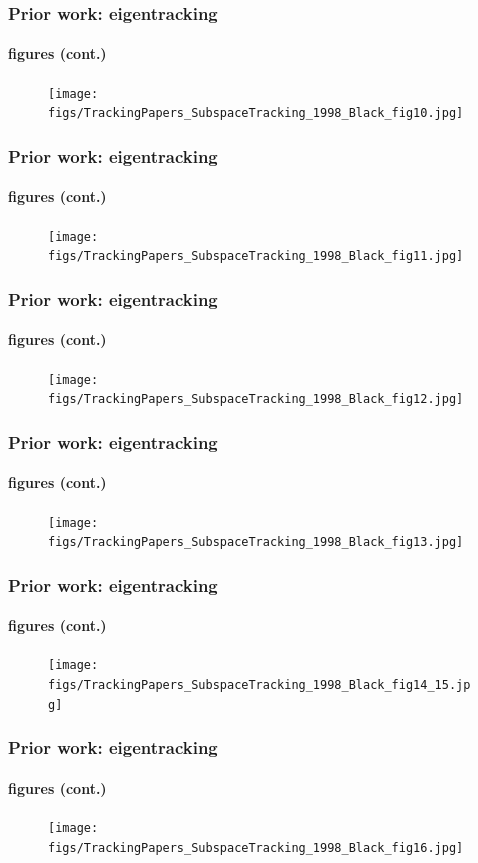 \begin{frame}
\frametitle{Prior work: eigentracking}
\framesubtitle{figures (cont.)}
\logoCSIPCPL\mypagenum
	\begin{figure}
		\texttt{[image: figs/TrackingPapers\_SubspaceTracking\_1998\_Black\_fig10.jpg]}
	\end{figure}
\end{frame}


\begin{frame}
\frametitle{Prior work: eigentracking}
\framesubtitle{figures (cont.)}
\logoCSIPCPL\mypagenum
	\begin{figure}
		\texttt{[image: figs/TrackingPapers\_SubspaceTracking\_1998\_Black\_fig11.jpg]}
	\end{figure}
\end{frame}




\begin{frame}
\frametitle{Prior work: eigentracking}
\framesubtitle{figures (cont.)}
\logoCSIPCPL\mypagenum
	\begin{figure}
		\texttt{[image: figs/TrackingPapers\_SubspaceTracking\_1998\_Black\_fig12.jpg]}
	\end{figure}
\end{frame}




\begin{frame}
\frametitle{Prior work: eigentracking}
\framesubtitle{figures (cont.)}
\logoCSIPCPL\mypagenum
	\begin{figure}
		\texttt{[image: figs/TrackingPapers\_SubspaceTracking\_1998\_Black\_fig13.jpg]}
	\end{figure}
\end{frame}



\begin{frame}
\frametitle{Prior work: eigentracking}
\framesubtitle{figures (cont.)}
\logoCSIPCPL\mypagenum
	\begin{figure}
		\texttt{[image: figs/TrackingPapers\_SubspaceTracking\_1998\_Black\_fig14\_15.jpg]}
	\end{figure}
\end{frame}


\begin{frame}
\frametitle{Prior work: eigentracking}
\framesubtitle{figures (cont.)}
\logoCSIPCPL\mypagenum
	\begin{figure}
		\texttt{[image: figs/TrackingPapers\_SubspaceTracking\_1998\_Black\_fig16.jpg]}
	\end{figure}
\end{frame}

